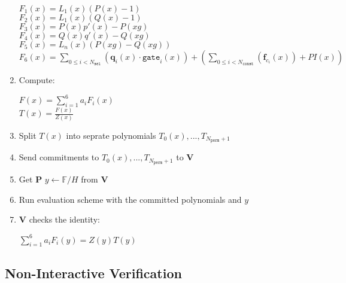 \begin{enumerate}
\begin{center}
		$F_1(x) = L_1(x)(P(x) - 1)$\\
		$F_2(x) = L_1(x)(Q(x) - 1)$ \\
		$F_3(x) = P(x)p'(x) - P(xg)$ \\
		$F_4(x) = Q(x)q'(x) - Q(xg)$ \\
		$F_5(x) = L_n(x)(P(xg) - Q(xg))$ \\
		$F_6(x) = \sum\limits_{0 \leq i < N_{\texttt{sel}}} (\textbf{q}_{i}(x) \cdot \texttt{gate}_i(x))
			+ (\sum\limits_{0 \leq i < N_{\texttt{const}}}(\textbf{f}_{c_i}(x)) + PI(x))$
	\end{center}
	\item Compute:
	\begin{center}
		$F(x) = \sum\limits_{i = 1}^6 a_iF_i(x)$ \\
		$T(x) = \frac{F(x)}{Z(x)}$
	\end{center}
	\item Split $T(x)$ into seprate polynomials $T_0(x), ..., T_{N_{\texttt{perm}} + 1}$
	\item Send commitments to $T_0(x), ..., T_{N_{\texttt{perm}} + 1}$ to \textbf{V}
	\item Get \textbf{P} $y \leftarrow \mathbb{F}/H$ from \textbf{V}
	\item Run evaluation scheme with the committed polynomials and $y$
	\item \textbf{V} checks the identity:
		\begin{center}
			$\sum\limits_{i = 1}^6a_iF_i(y) = Z(y)T(y)$
		\end{center}
\end{enumerate}

\subsection{Non-Interactive Verification}

